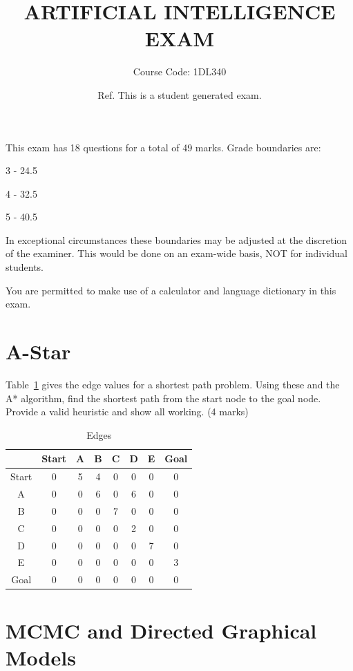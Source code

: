 \documentclass{article}
\begin{document}
 \title{ARTIFICIAL INTELLIGENCE EXAM}
 \author{Course Code: 1DL340}
 \date{Ref.  This is a student generated exam. }
 \maketitle

 This exam has  18  questions for a total of  49  marks. Grade boundaries are:

 \begin{center}
 3 -  24.5 

 4 -  32.5 

 5 -  40.5 

 \end{center}

 In exceptional circumstances these boundaries may be adjusted at the discretion of the examiner. This would be done on an exam-wide basis, NOT for individual students.

 You are permitted to make use of a calculator and language dictionary in this exam.
\clearpage
\section{A-Star}

Table~\ref{AStar_Edges} gives the edge values for a shortest path problem. Using these and the A* algorithm, find the shortest path from the start node to the goal node. Provide a valid heuristic and show all working. (4 marks)

\begin{table}[h!]
\caption{Edges}
\label{AStar_Edges}
\begin{center}
\begin{tabular}{ |c||c|c|c|c|c|c|c| } 
\hline
 & Start & A & B & C & D & E & Goal\\
\hline
Start & 0 & 5 & 4 & 0 & 0 & 0 & 0\\
A & 0 & 0 & 6 & 0 & 6 & 0 & 0\\
B & 0 & 0 & 0 & 7 & 0 & 0 & 0\\
C & 0 & 0 & 0 & 0 & 2 & 0 & 0\\
D & 0 & 0 & 0 & 0 & 0 & 7 & 0\\
E & 0 & 0 & 0 & 0 & 0 & 0 & 3\\
Goal & 0 & 0 & 0 & 0 & 0 & 0 & 0\\
\hline
\end{tabular}
\end{center}
\end{table}
\clearpage
\section{MCMC and Directed Graphical Models}
\end{document}
